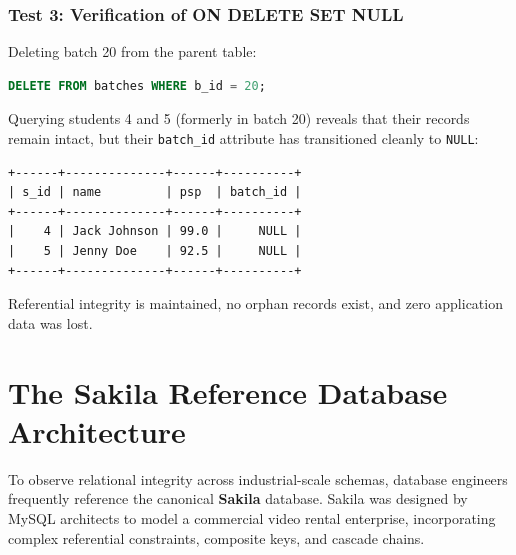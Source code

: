\documentclass[10pt,journal,compsoc,onecolumn]{IEEEtran}
\begin{document}
\subsubsection{Test 3: Verification of ON DELETE SET NULL}
Deleting batch 20 from the parent table:
\begin{lstlisting}[language=SQL]
DELETE FROM batches WHERE b_id = 20;
\end{lstlisting}
Querying students 4 and 5 (formerly in batch 20) reveals that their records remain intact, but their \texttt{batch\_id} attribute has transitioned cleanly to \texttt{NULL}:
\begin{verbatim}
+------+--------------+------+----------+
| s_id | name         | psp  | batch_id |
+------+--------------+------+----------+
|    4 | Jack Johnson | 99.0 |     NULL |
|    5 | Jenny Doe    | 92.5 |     NULL |
+------+--------------+------+----------+
\end{verbatim}
Referential integrity is maintained, no orphan records exist, and zero application data was lost.

\section{The Sakila Reference Database Architecture}
\label{sec:sakila_architecture}

To observe relational integrity across industrial-scale schemas, database engineers frequently reference the canonical \textbf{Sakila} database. Sakila was designed by MySQL architects to model a commercial video rental enterprise, incorporating complex referential constraints, composite keys, and cascade chains.
\end{document}
